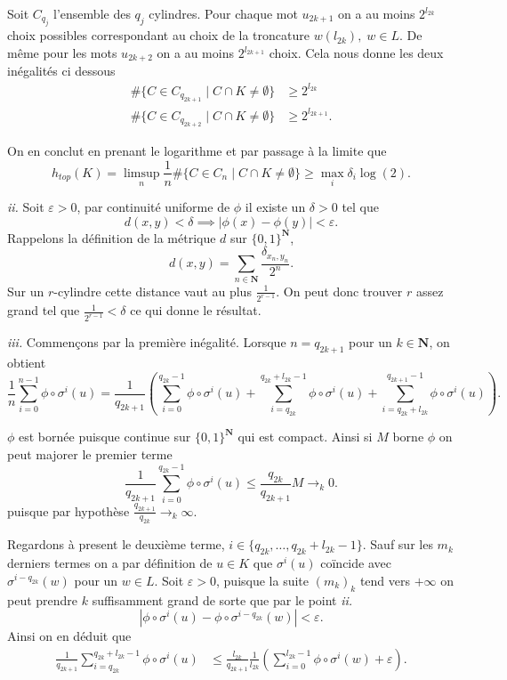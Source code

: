\documentclass[12pt]{article}
\newcommand{\N}{\mathbf{N}}
\begin{document}
Soit $C_{q_{j}}$ l'ensemble des $q_{j}$ cylindres. Pour chaque mot $u_{2k+1}$ on a au moins $2^{l_{2k}}$ choix possibles correspondant au choix de la troncature $w(l_{2k}), \; w \in L$. De même pour les mots $u_{2k+2}$ on a au moins $2^{l_{2k+1}}$ choix. Cela nous donne les deux inégalités ci dessous
\begin{align*}
        \#\{C \in C_{q_{2k+1}} \;|\; C \cap K \neq \emptyset\} &\ge 2^{l_{2k}} \\
        \#\{C \in C_{q_{2k+2}} \;|\; C \cap K \neq \emptyset\} &\ge 2^{l_{2k+1}}
.\end{align*}

On en conclut en prenant le logarithme et par passage à la limite que \[
        h_{top}(K) = \limsup_{n}\frac{1}{n}\#\{C\in C_{n} \;|\; C \cap K \neq \emptyset\} \ge \max_{i}\delta_{i}\log(2)
.\] 

\medskip

\textit{ii.} Soit $\varepsilon > 0$, par continuité uniforme de $\phi$ il existe un $\delta > 0$ tel que  \[
        d(x,y) < \delta \implies |\phi(x)-\phi(y)| < \varepsilon
.\]  Rappelons la définition de la métrique $d$ sur $\{0,1\}^{\N}$, \[
d(x,y) = \sum_{n\in\N} \frac{\delta_{x_{n},y_{n}}}{2^{n}}
.\] Sur un $r$-cylindre cette distance vaut au plus $\frac{1}{2^{r-1}}$. On peut donc trouver $r$ assez grand tel que $\frac{1}{2^{r-1}} < \delta$ ce qui donne le résultat.

\medskip

\textit{iii.}  Commençons par la première inégalité. Lorsque $n = q_{2k+1}$ pour un $k\in\N$, on obtient \[
        \frac{1}{n}\sum_{i=0}^{n-1} \phi\circ\sigma^{i}(u) = \frac{1}{q_{2k+1}}(\sum_{i=0}^{q_{2k}-1} \phi\circ\sigma^{i}(u) + \sum_{i=q_{2k}}^{q_{2k}+l_{2k}-1} \phi\circ\sigma^{i}(u) + \sum_{i=q_{2k}+l_{2k}}^{q_{2k+1}-1} \phi\circ\sigma^{i}(u))
.\] 

$\phi$ est bornée puisque continue sur $\{0,1\}^{\N}$ qui est compact. Ainsi si $M$ borne $\phi$ on peut majorer le premier terme  \[
        \frac{1}{q_{2k+1}}\sum_{i=0}^{q_{2k}-1} \phi\circ\sigma^{i}(u) \le \frac{q_{2k}}{q_{2k+1}}M \to_{k} 0
.\] puisque par hypothèse $\frac{q_{2k+1}}{q_{2k}} \to_{k} \infty$.

Regardons à present le deuxième terme, $i \in \{q_{2k}, \ldots, q_{2k} +l_{2k}-1\}$. Sauf sur les $m_{k}$ derniers termes on a par définition de $u \in K$ que $\sigma^{i}(u)$ coïncide avec $\sigma^{i - q_{2k}}(w)$ pour un $w \in L$. Soit $\varepsilon > 0$, puisque la suite $(m_{k})_{k}$ tend vers $+\infty$ on peut prendre $k$ suffisamment grand de sorte que par le point \textit{ii.}  \[
        |\phi\circ\sigma^{i}(u) - \phi\circ\sigma^{i-q_{2k}}(w)| < \varepsilon
.\]  
Ainsi on en déduit que 
\begin{align*}
        \frac{1}{q_{2k+1}}\sum_{i=q_{2k}}^{q_{2k}+l_{2k}-1} \phi\circ\sigma^{i}(u) &\le \frac{l_{2k}}{q_{2k+1}}\frac{1}{l_{2k}}(\sum_{i=0}^{l_{2k}-1} \phi\circ\sigma^{i}(w) + \varepsilon) 
.\end{align*}
\end{document}
